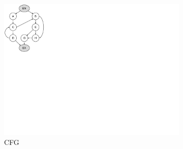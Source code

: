\begin{figure}[t!]
    \centering
    \begin{subfigure}[t]{0.17\textwidth}
        \includegraphics[clip, trim=0.1cm 12.1cm 19.6cm 0.1cm, width=\textwidth]{fig/bcov-03-probe-prunning}
        \caption{\small CFG}
        \label{fig:3:cfg}
    \end{subfigure}
    \hspace{0.5cm}
    \begin{subfigure}[t]{0.15\textwidth}

\end{subfigure}
\end{figure}
